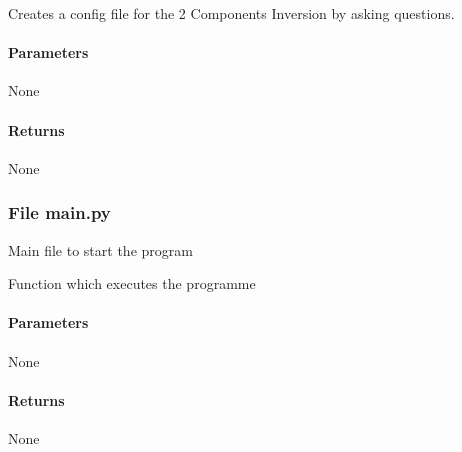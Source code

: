 \documentclass[letterpaper,10pt,english]{sphinxmanual}
\begin{document}

\begin{fulllineitems}
\label{\detokenize{functions:create_config.config_2C}}
\pysigstartsignatures
{}
\pysigstopsignatures
\sphinxAtStartPar
Creates a config file for the 2 Components Inversion by asking questions.


\paragraph{Parameters}
\label{\detokenize{functions:id34}}
\sphinxAtStartPar
None


\paragraph{Returns}
\label{\detokenize{functions:id35}}
\sphinxAtStartPar
None

\end{fulllineitems}



\subsubsection{File main.py}
\label{\detokenize{functions:file-main-py}}
\sphinxAtStartPar
Main file to start the program

\begin{fulllineitems}
\label{\detokenize{functions:main.main}}
\pysigstartsignatures
{}
\pysigstopsignatures
\sphinxAtStartPar
Function which executes the programme


\paragraph{Parameters}
\label{\detokenize{functions:id36}}
\sphinxAtStartPar
None


\paragraph{Returns}
\label{\detokenize{functions:id37}}
\sphinxAtStartPar
None

\end{fulllineitems}
\end{document}
